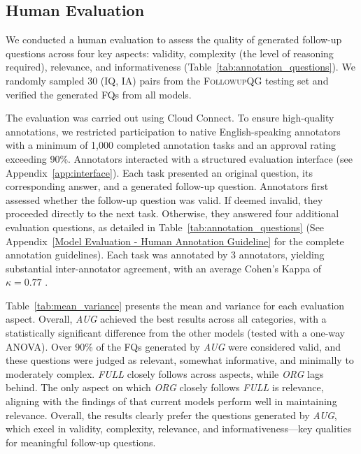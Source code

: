 


\subsection{Human Evaluation}
\label{sec:results:human}

We conducted a human evaluation to assess the quality of generated follow-up questions across four key aspects: validity, complexity (the level of reasoning required), relevance, and informativeness (Table~\ref{tab:annotation_questions}). We randomly sampled 30 (IQ, IA) pairs from the \textsc{FollowupQG} testing set and verified the generated FQs from all models. 

The evaluation was carried out using Cloud Connect. To ensure high-quality annotations, we restricted participation to native English-speaking annotators with a minimum of 1,000 completed annotation tasks and an approval rating exceeding 90\%. Annotators interacted with a structured evaluation interface (see Appendix~\ref{app:interface}). Each task presented an original question, its corresponding answer, and a generated follow-up question. Annotators first assessed whether the follow-up question was valid. If deemed invalid, they proceeded directly to the next task. Otherwise, they answered four additional evaluation questions, as detailed in Table~\ref{tab:annotation_questions} (See Appendix~\ref{Model Evaluation - Human Annotation Guideline} for the complete annotation guidelines). 
Each task was annotated by 3 annotators, yielding substantial inter-annotator agreement, with an average Cohen's Kappa of $\kappa = 0.77$ \cite{mchugh2012interrater}.


% 

Table~\ref{tab:mean_variance} presents the mean and variance for each evaluation aspect. Overall, \textit{AUG} achieved the best results across all categories, with a statistically significant difference from the other models (tested with a one-way ANOVA). Over 90\% of the FQs generated by \textit{AUG} were considered valid, and these questions were judged as relevant, somewhat informative, and minimally to moderately complex. \textit{FULL} closely follows across aspects, while \textit{ORG} lags behind. The only aspect on which \textit{ORG} closely follows \textit{FULL} is relevance, aligning with the findings of \citet{meng-etal-2023-followupqg} that current models perform well in maintaining relevance. Overall, the results clearly prefer the questions generated by \textit{AUG}, which excel in validity, complexity, relevance, and informativeness—key qualities for meaningful follow-up questions. 


